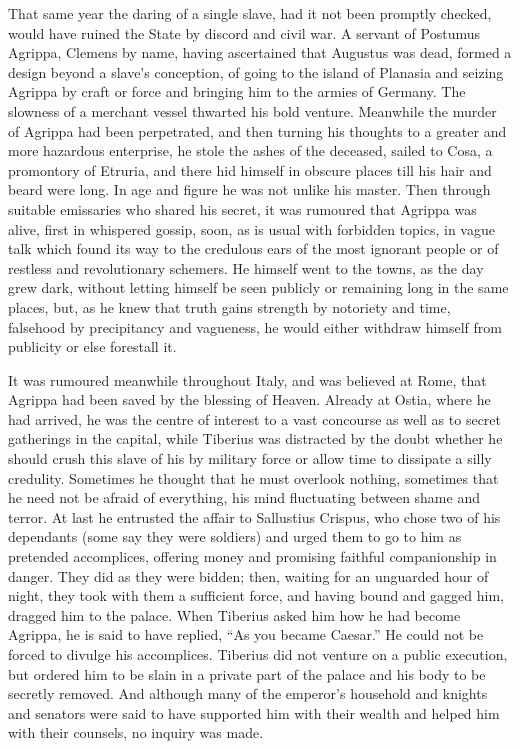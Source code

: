 That same year the daring of a single slave, had it not been promptly checked, would have ruined the State by discord and civil war. A servant of Postumus Agrippa, Clemens by name, having ascertained that Augustus was dead, formed a design beyond a slave's conception, of going to the island of Planasia and seizing Agrippa by craft or force and bringing him to the armies of Germany. The slowness of a merchant vessel thwarted his bold venture. Meanwhile the murder of Agrippa had been perpetrated, and then turning his thoughts to a greater and more hazardous enterprise, he stole the ashes of the deceased, sailed to Cosa, a promontory of Etruria, and there hid himself in obscure places till his hair and beard were long. In age and figure he was not unlike his master. Then through suitable emissaries who shared his secret, it was rumoured that Agrippa was alive, first in whispered gossip, soon, as is usual with forbidden topics, in vague talk which found its way to the credulous ears of the most ignorant people or of restless and revolutionary schemers. He himself went to the towns, as the day grew dark, without letting himself be seen publicly or remaining long in the same places, but, as he knew that truth gains strength by notoriety and time, falsehood by precipitancy and vagueness, he would either withdraw himself from publicity or else forestall it.


It was rumoured meanwhile throughout Italy, and was believed at Rome, that Agrippa had been saved by the blessing of Heaven. Already at Ostia, where he had arrived, he was the centre of interest to a vast concourse as well as to secret gatherings in the capital, while Tiberius was distracted by the doubt whether he should crush this slave of his by military force or allow time to dissipate a silly credulity. Sometimes he thought that he must overlook nothing, sometimes that he need not be afraid of everything, his mind fluctuating between shame and terror. At last he entrusted the affair to Sallustius Crispus, who chose two of his dependants (some say they were soldiers) and urged them to go to him as pretended accomplices, offering money and promising faithful companionship in danger. They did as they were bidden; then, waiting for an unguarded hour of night, they took with them a sufficient force, and having bound and gagged him, dragged him to the palace. When Tiberius asked him how he had become Agrippa, he is said to have replied, ``As you became Caesar.'' He could not be forced to divulge his accomplices. Tiberius did not venture on a public execution, but ordered him to be slain in a private part of the palace and his body to be secretly removed. And although many of the emperor's household and knights and senators were said to have supported him with their wealth and helped him with their counsels, no inquiry was made.

